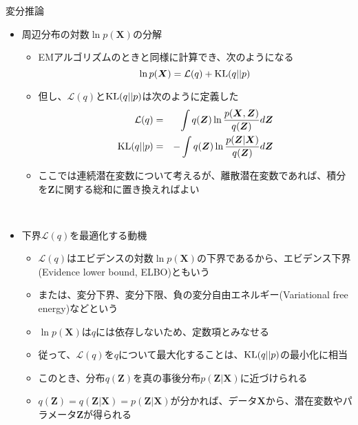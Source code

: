 \documentclass[dvipdfmx,notheorems,t]{beamer}
\begin{document}
\begin{frame}{変分推論}

\begin{itemize}
	\item 周辺分布の対数$\ln p(\bm{X})$の分解
	\begin{itemize}
		\item EMアルゴリズムのときと同様に計算でき、次のようになる
		\begin{equation}
			\ln p(\bm{X}) = \mathcal{L}(q) + \operatorname{KL} (q || p)
		\end{equation}
		
		\item 但し、$\mathcal{L}(q)$と$\operatorname{KL} (q || p)$は次のように定義した
		\begin{eqnarray}
			\mathcal{L}(q) &=& \int q(\bm{Z}) \ln \frac{p(\bm{X}, \bm{Z})}{q(\bm{Z})} d\bm{Z} \\
			\operatorname{KL} (q || p) &=& -\int q(\bm{Z}) \ln \frac{p(\bm{Z} | \bm{X})}{q(\bm{Z})} d\bm{Z}
		\end{eqnarray}
		
		\item ここでは連続潜在変数について考えるが、離散潜在変数であれば、積分を$\bm{Z}$に関する総和に置き換えればよい
	\end{itemize} \
	
	\framebreak
	
	\item 下界$\mathcal{L}(q)$を最適化する動機
	\begin{itemize}
		\item $\mathcal{L}(q)$はエビデンスの対数$\ln p(\bm{X})$の下界であるから、\alert{エビデンス下界}(Evidence lower bound, \alert{ELBO})ともいう
		\item または、\alert{変分下界}、\alert{変分下限}、負の\alert{変分自由エネルギー}(Variational free energy)などという
		\newline
		
		\item $\ln p(\bm{X})$は$q$には依存しないため、定数項とみなせる
		\item 従って、$\mathcal{L}(q)$を$q$について最大化することは、$\operatorname{KL} (q || p)$の最小化に相当
		\item このとき、分布$q(\bm{Z})$を真の事後分布$p(\bm{Z} | \bm{X})$に近づけられる
		\newline
		
		\item $q(\bm{Z}) = q(\bm{Z} | \bm{X}) = p(\bm{Z} | \bm{X})$が分かれば、データ$\bm{X}$から、\color{red}潜在変数やパラメータ$\bm{Z}$が得られる\normalcolor
		\newline
		

\end{itemize}
\end{itemize}
\end{frame}
\end{document}
